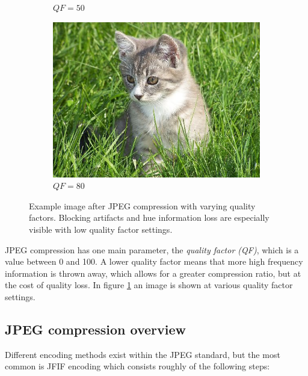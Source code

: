 \begin{figure}[ht]
\begin{subfigure}{.33\textwidth}
  \caption{$QF=50$}
\end{subfigure}%
\begin{subfigure}{.33\textwidth}
  \centering
  \includegraphics[width=.98\linewidth]{../images/compression_examples/qf80}
  \caption{$QF=80$}
\end{subfigure}%
\caption{Example image after JPEG compression with varying quality factors. Blocking artifacts and hue information loss are especially visible with low quality factor settings.}
\label{fig_compression_qf}
\end{figure}%


JPEG compression has one main parameter, the \emph{quality factor (QF)}, which is a value between 0 and 100. A lower quality factor means that more high frequency information is thrown away, which allows for a greater compression ratio, but at the cost of quality loss. In figure \ref{fig_compression_qf} an image is shown at various quality factor settings.


\subsection{JPEG compression overview}

Different encoding methods exist within the JPEG standard, but the most common is JFIF encoding which consists roughly of the following steps:


